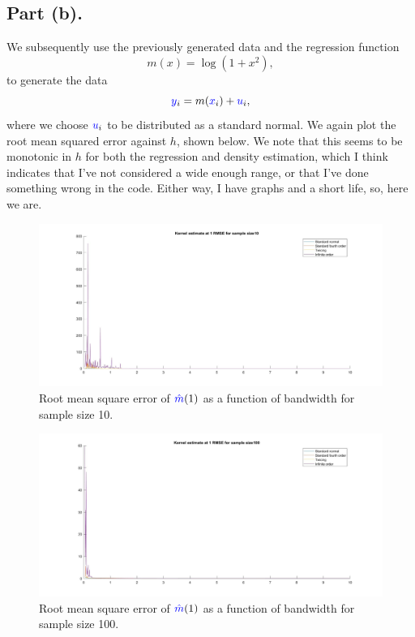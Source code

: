 \documentclass{article}
\renewcommand{\r}[1]{\textcolor{blue}{#1}}
\begin{document}
\subsection{Part (b).}
We subsequently use the previously generated data and the regression function 
\begin{equation} m(x)=\log(1+x^{2}),\end{equation}
to generate the data
\begin{equation} \r{y}_{i} = m(\r{x}_{i})+\r{u}_{i},\end{equation}
where we choose $\r{u}_{i}$ to be distributed as a standard normal. We again plot the root mean squared error against $h$, shown below. We note that this seems to be monotonic in $h$ for both the regression and density estimation, which I think indicates that I've not considered a wide enough range, or that I've done something wrong in the code. Either way, I have graphs and a short life, so, here we are. 

\begin{center}
\begin{figure}
\centering
\includegraphics[width=13cm]{q2rmse10m.jpg}
\caption{Root mean square error of $\r{\hat{m}}(1)$ as a function of bandwidth for sample size 10.}
\label{fig:2rmse10m}
\end{figure} 
\end{center}

\begin{center}
\begin{figure}
\centering
\includegraphics[width=13cm]{q2rmse100m.jpg}
\caption{Root mean square error of $\r{\hat{m}}(1)$ as a function of bandwidth for sample size 100.}
\label{fig:2rmse100m}
\end{figure} 
\end{center}
\end{document}
